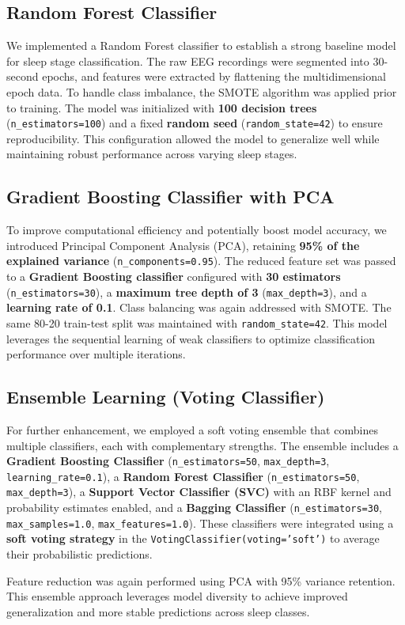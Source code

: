 \subsection{Random Forest Classifier}

We implemented a Random Forest classifier to establish a strong baseline model for sleep stage classification. The raw EEG recordings were segmented into 30-second epochs, and features were extracted by flattening the multidimensional epoch data. To handle class imbalance, the SMOTE algorithm was applied prior to training. The model was initialized with \textbf{100 decision trees} (\texttt{n\_estimators=100}) and a fixed \textbf{random seed} (\texttt{random\_state=42}) to ensure reproducibility. This configuration allowed the model to generalize well while maintaining robust performance across varying sleep stages.

\subsection{Gradient Boosting Classifier with PCA}

To improve computational efficiency and potentially boost model accuracy, we introduced Principal Component Analysis (PCA), retaining \textbf{95\% of the explained variance} (\texttt{n\_components=0.95}). The reduced feature set was passed to a \textbf{Gradient Boosting classifier} configured with \textbf{30 estimators} (\texttt{n\_estimators=30}), a \textbf{maximum tree depth of 3} (\texttt{max\_depth=3}), and a \textbf{learning rate of 0.1}. Class balancing was again addressed with SMOTE. The same 80-20 train-test split was maintained with \texttt{random\_state=42}. This model leverages the sequential learning of weak classifiers to optimize classification performance over multiple iterations.

\subsection{Ensemble Learning (Voting Classifier)}

\begin{sloppypar}
	For further enhancement, we employed a soft voting ensemble that combines multiple classifiers, each with complementary strengths. The ensemble includes a \textbf{Gradient Boosting Classifier} (\texttt{n\_estimators=50}, \texttt{max\_depth=3}, \texttt{learning\_rate=0.1}), a \textbf{Random Forest Classifier} (\texttt{n\_estimators=50}, \texttt{max\_depth=3}), a \textbf{Support Vector Classifier (SVC)} with an RBF kernel and probability estimates enabled, and a \textbf{Bagging Classifier} (\texttt{n\_estimators=30}, \texttt{max\_samples=1.0}, \texttt{max\_features=1.0}). These classifiers were integrated using a \textbf{soft voting strategy} in the \texttt{VotingClassifier(voting='soft')} to average their probabilistic predictions.
	
	Feature reduction was again performed using PCA with 95\% variance retention. This ensemble approach leverages model diversity to achieve improved generalization and more stable predictions across sleep classes.
\end{sloppypar}


